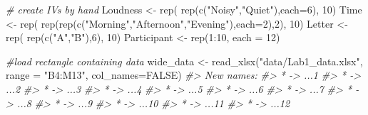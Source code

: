 \documentclass[
]{book}
\newenvironment{Shaded}{\begin{snugshade}}{\end{snugshade}}
\newcommand{\AttributeTok}[1]{\textcolor[rgb]{0.77,0.63,0.00}{#1}}
\newcommand{\CommentTok}[1]{\textcolor[rgb]{0.56,0.35,0.01}{\textit{#1}}}
\newcommand{\ConstantTok}[1]{\textcolor[rgb]{0.00,0.00,0.00}{#1}}
\newcommand{\DecValTok}[1]{\textcolor[rgb]{0.00,0.00,0.81}{#1}}
\newcommand{\FunctionTok}[1]{\textcolor[rgb]{0.00,0.00,0.00}{#1}}
\newcommand{\NormalTok}[1]{#1}
\newcommand{\OtherTok}[1]{\textcolor[rgb]{0.56,0.35,0.01}{#1}}
\newcommand{\SpecialCharTok}[1]{\textcolor[rgb]{0.00,0.00,0.00}{#1}}
\newcommand{\StringTok}[1]{\textcolor[rgb]{0.31,0.60,0.02}{#1}}
\theoremstyle{definition}
\theoremstyle{definition}
\theoremstyle{definition}
\theoremstyle{definition}
\theoremstyle{remark}
\begin{document}
\begin{Shaded}
\begin{Highlighting}[]
\CommentTok{\# create IVs by hand}
\NormalTok{Loudness }\OtherTok{\textless{}{-}} \FunctionTok{rep}\NormalTok{( }\FunctionTok{rep}\NormalTok{(}\FunctionTok{c}\NormalTok{(}\StringTok{"Noisy"}\NormalTok{,}\StringTok{"Quiet"}\NormalTok{),}\AttributeTok{each=}\DecValTok{6}\NormalTok{), }\DecValTok{10}\NormalTok{)}
\NormalTok{Time     }\OtherTok{\textless{}{-}} \FunctionTok{rep}\NormalTok{( }\FunctionTok{rep}\NormalTok{(}\FunctionTok{rep}\NormalTok{(}\FunctionTok{c}\NormalTok{(}\StringTok{"Morning"}\NormalTok{,}\StringTok{"Afternoon"}\NormalTok{,}\StringTok{"Evening"}\NormalTok{),}\AttributeTok{each=}\DecValTok{2}\NormalTok{),}\DecValTok{2}\NormalTok{), }\DecValTok{10}\NormalTok{)}
\NormalTok{Letter   }\OtherTok{\textless{}{-}} \FunctionTok{rep}\NormalTok{( }\FunctionTok{rep}\NormalTok{(}\FunctionTok{c}\NormalTok{(}\StringTok{"A"}\NormalTok{,}\StringTok{"B"}\NormalTok{),}\DecValTok{6}\NormalTok{), }\DecValTok{10}\NormalTok{)}
\NormalTok{Participant }\OtherTok{\textless{}{-}} \FunctionTok{rep}\NormalTok{(}\DecValTok{1}\SpecialCharTok{:}\DecValTok{10}\NormalTok{, }\AttributeTok{each =} \DecValTok{12}\NormalTok{)}

\CommentTok{\#load rectangle containing data}
\NormalTok{wide\_data }\OtherTok{\textless{}{-}} \FunctionTok{read\_xlsx}\NormalTok{(}\StringTok{"data/Lab1\_data.xlsx"}\NormalTok{,}
                          \AttributeTok{range =} \StringTok{"B4:M13"}\NormalTok{, }
                          \AttributeTok{col\_names=}\ConstantTok{FALSE}\NormalTok{)}
\CommentTok{\#\textgreater{} New names:}
\CommentTok{\#\textgreater{} * \textasciigrave{}\textasciigrave{} {-}\textgreater{} \textasciigrave{}...1\textasciigrave{}}
\CommentTok{\#\textgreater{} * \textasciigrave{}\textasciigrave{} {-}\textgreater{} \textasciigrave{}...2\textasciigrave{}}
\CommentTok{\#\textgreater{} * \textasciigrave{}\textasciigrave{} {-}\textgreater{} \textasciigrave{}...3\textasciigrave{}}
\CommentTok{\#\textgreater{} * \textasciigrave{}\textasciigrave{} {-}\textgreater{} \textasciigrave{}...4\textasciigrave{}}
\CommentTok{\#\textgreater{} * \textasciigrave{}\textasciigrave{} {-}\textgreater{} \textasciigrave{}...5\textasciigrave{}}
\CommentTok{\#\textgreater{} * \textasciigrave{}\textasciigrave{} {-}\textgreater{} \textasciigrave{}...6\textasciigrave{}}
\CommentTok{\#\textgreater{} * \textasciigrave{}\textasciigrave{} {-}\textgreater{} \textasciigrave{}...7\textasciigrave{}}
\CommentTok{\#\textgreater{} * \textasciigrave{}\textasciigrave{} {-}\textgreater{} \textasciigrave{}...8\textasciigrave{}}
\CommentTok{\#\textgreater{} * \textasciigrave{}\textasciigrave{} {-}\textgreater{} \textasciigrave{}...9\textasciigrave{}}
\CommentTok{\#\textgreater{} * \textasciigrave{}\textasciigrave{} {-}\textgreater{} \textasciigrave{}...10\textasciigrave{}}
\CommentTok{\#\textgreater{} * \textasciigrave{}\textasciigrave{} {-}\textgreater{} \textasciigrave{}...11\textasciigrave{}}
\CommentTok{\#\textgreater{} * \textasciigrave{}\textasciigrave{} {-}\textgreater{} \textasciigrave{}...12\textasciigrave{}}


\end{Highlighting}
\end{Shaded}
\end{document}
